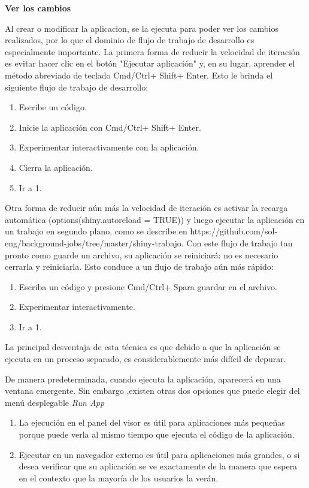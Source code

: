 \textbf{Ver los cambios}


Al crear o modificar la aplicacion, se la ejecuta para poder ver los cambios realizados, por lo que el dominio de flujo de trabajo de desarrollo es especialmente importante. La primera forma de reducir la velocidad de iteración es evitar hacer clic en el botón "Ejecutar aplicación" y, en su lugar, aprender el método abreviado de teclado Cmd/Ctrl+ Shift+ Enter. Esto le brinda el siguiente flujo de trabajo de desarrollo:

\begin{enumerate}
\item Escribe un código.
\item Inicie la aplicación con Cmd/Ctrl+ Shift+ Enter.
\item Experimentar interactivamente con la aplicación.
\item Cierra la aplicación.
\item Ir a 1.
\end{enumerate}


Otra forma de reducir aún más la velocidad de iteración es activar la recarga automática (options(shiny.autoreload = TRUE)) y luego ejecutar la aplicación en un trabajo en segundo plano, como se describe en https://github.com/sol-eng/background-jobs/tree/master/shiny-trabajo. Con este flujo de trabajo tan pronto como guarde un archivo, su aplicación se reiniciará: no es necesario cerrarla y reiniciarla. Esto conduce a un flujo de trabajo aún más rápido:
\begin{enumerate}
\item Escriba un código y presione Cmd/Ctrl+ Spara guardar en el archivo.
\item Experimentar interactivamente.
\item Ir a 1.
\end{enumerate}
La principal desventaja de esta técnica es que debido a que la aplicación se ejecuta en un proceso separado, es considerablemente más difícil de depurar.

De manera predeterminada, cuando ejecuta la aplicación, aparecerá en una ventana emergente. Sin embargo ,existen otras dos opciones que puede elegir del menú desplegable \emph{Run App}
\begin{enumerate}
\item La ejecución en el panel del visor es útil para aplicaciones más pequeñas porque puede verla al mismo tiempo que ejecuta el código de la aplicación.
\item Ejecutar en un navegador externo es útil para aplicaciones más grandes, o si desea verificar que su aplicación se ve exactamente de la manera que espera en el contexto que la mayoría de los usuarios la verán.
\end{enumerate}



